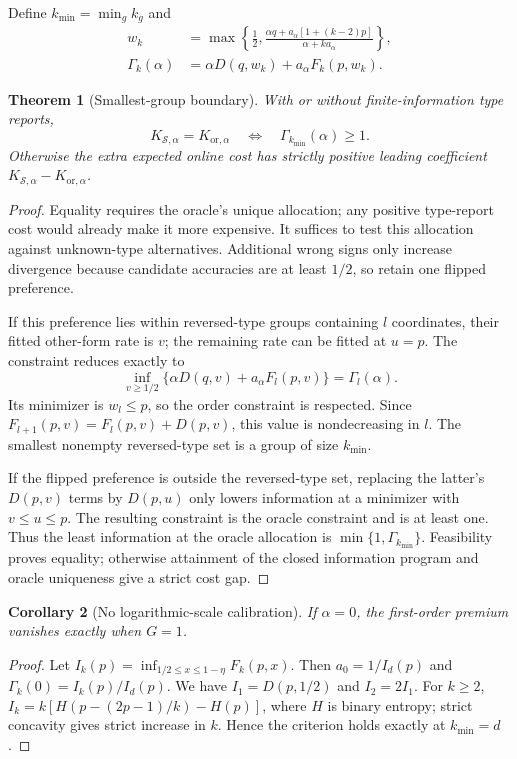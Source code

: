 \documentclass[sigconf,anonymous,review]{acmart}
\newtheorem{theorem}{Theorem}
\newtheorem{corollary}[theorem]{Corollary}
\newcommand{\Kor}{K_{\mathrm{or},\alpha}}
\newcommand{\KS}{K_{\mathcal S,\alpha}}
\begin{document}
Define $k_{\min}=\min_g k_g$ and
\begin{align}
 w_k&=\max\left\{\tfrac12,\frac{\alpha q+a_\alpha[1+(k-2)p]}{\alpha+ka_\alpha}\right\},\label{eq:w}\\
 \Gamma_k(\alpha)&=\alpha D(q,w_k)+a_\alpha F_k(p,w_k).\label{eq:gamma}
\end{align}
\begin{theorem}[Smallest-group boundary]\label{thm:boundary}
With or without finite-information type reports,
\begin{equation}\label{eq:boundary}
 \boxed{\KS=\Kor\quad\Longleftrightarrow\quad\Gamma_{k_{\min}}(\alpha)\ge1.}
\end{equation}
Otherwise the extra expected online cost has strictly positive leading coefficient $\KS-\Kor$.
\end{theorem}
\begin{proof}
Equality requires the oracle's unique allocation; any positive type-report cost would already make it more expensive. It suffices to test this allocation against unknown-type alternatives. Additional wrong signs only increase divergence because candidate accuracies are at least $1/2$, so retain one flipped preference.

If this preference lies within reversed-type groups containing $l$ coordinates, their fitted other-form rate is $v$; the remaining rate can be fitted at $u=p$. The constraint reduces exactly to
\[
 \inf_{v\ge1/2}\{\alpha D(q,v)+a_\alpha F_l(p,v)\}=\Gamma_l(\alpha).
\]
Its minimizer is $w_l\le p$, so the order constraint is respected. Since $F_{l+1}(p,v)=F_l(p,v)+D(p,v)$, this value is nondecreasing in $l$. The smallest nonempty reversed-type set is a group of size $k_{\min}$.

If the flipped preference is outside the reversed-type set, replacing the latter's $D(p,v)$ terms by $D(p,u)$ only lowers information at a minimizer with $v\le u\le p$. The resulting constraint is the oracle constraint and is at least one. Thus the least information at the oracle allocation is $\min\{1,\Gamma_{k_{\min}}\}$. Feasibility proves equality; otherwise attainment of the closed information program and oracle uniqueness give a strict cost gap.
\end{proof}

\begin{corollary}[No logarithmic-scale calibration]\label{cor:zero}
If $\alpha=0$, the first-order premium vanishes exactly when $G=1$.
\end{corollary}
\begin{proof}
Let $I_k(p)=\inf_{1/2\le x\le1-\eta}F_k(p,x)$. Then $a_0=1/I_d(p)$ and $\Gamma_k(0)=I_k(p)/I_d(p)$. We have $I_1=D(p,1/2)$ and $I_2=2I_1$. For $k\ge2$, $I_k=k[H(p-(2p-1)/k)-H(p)]$, where $H$ is binary entropy; strict concavity gives strict increase in $k$. Hence the criterion holds exactly at $k_{\min}=d$.
\end{proof}
\end{document}
